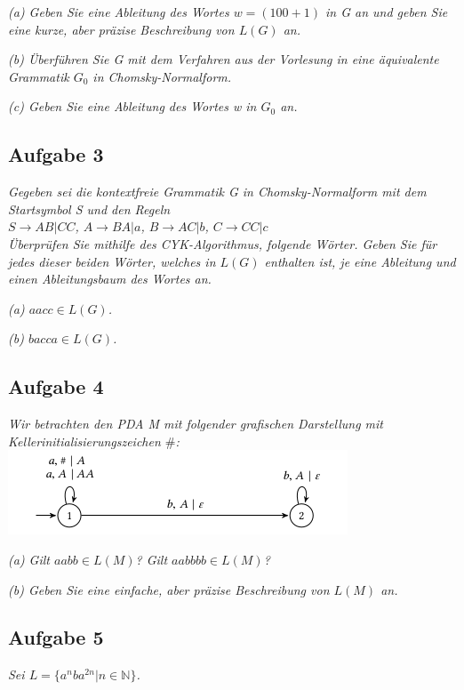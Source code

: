 \documentclass[a4paper]{article}
\begin{document}
\textit{(a) Geben Sie eine Ableitung des Wortes $w = (100 + 1)$ in G an und geben Sie eine kurze, aber präzise Beschreibung von $L(G)$ an.}

\textit{(b) Überführen Sie G mit dem Verfahren aus der Vorlesung in eine äquivalente Grammatik $G_0$ in Chomsky-Normalform.}

\textit{(c) Geben Sie eine Ableitung des Wortes w in $G_0$ an.}


\subsection{Aufgabe 3}
\textit{Gegeben sei die kontextfreie Grammatik G in Chomsky-Normalform mit dem Startsymbol S und den Regeln\\
    $S \rightarrow AB | CC$, $A \rightarrow BA | a$, $B \rightarrow AC | b$, $C \rightarrow CC | c$\\
    Überprüfen Sie mithilfe des CYK-Algorithmus, folgende Wörter. Geben Sie für jedes dieser beiden Wörter, welches in $L(G)$ enthalten ist, je eine Ableitung und einen Ableitungsbaum des Wortes an.}

\textit{(a) $aacc \in L(G)$.}

\textit{(b) $bacca \in L(G)$. }



\subsection{Aufgabe 4}
\textit{Wir betrachten den PDA M mit folgender grafischen Darstellung mit Kellerinitialisierungszeichen $\#$:}
\includegraphics{Assets/ASK_uebung/u06_02.png}

\textit{(a) Gilt $aabb \in L(M)$? Gilt $aabbbb \in L(M)$?}

\textit{(b) Geben Sie eine einfache, aber präzise Beschreibung von $L(M)$ an.}

\subsection{Aufgabe 5}
\textit{Sei $L = \{a^n ba^{2n} | n\in\mathbb{N}\}$.}
\end{document}
